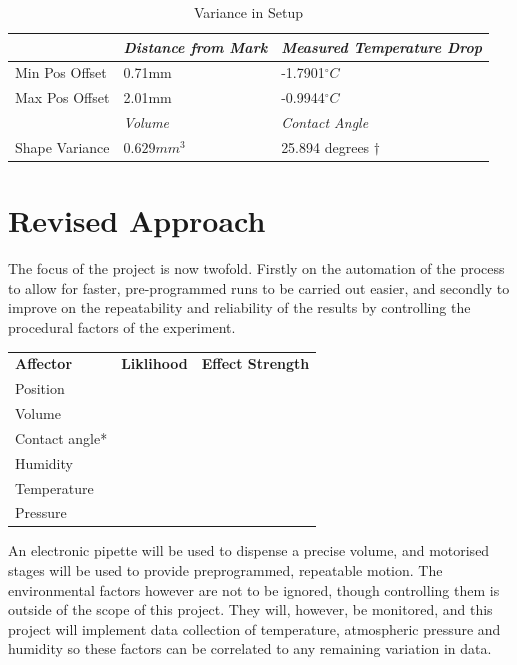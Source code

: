 \begin{table}[h]
    \centering
    \begin{tabular}{|l|l|l|}
    \hline
                   & \textit{Distance from Mark}          & \textit{Measured Temperature Drop} \\ \hline
    Min Pos Offset & 0.71mm                     &-1.7901$^{\circ}C$    \\ \hline
    Max Pos Offset &       2.01mm    &  -0.9944$^{\circ}C$    \\ \hline
                   & \textit{Volume}            & \textit{Contact Angle}          \\ \hline
    Shape Variance & $0.629mm^3$ & 25.894 degrees $\dagger$                \\ \hline
    \end{tabular}
    \caption{Variance in Setup}
    \end{table}


\section{Revised Approach}
The focus of the project is now twofold. Firstly on the automation of the process to allow for faster, pre-programmed runs to be carried out easier, and secondly to improve on the repeatability and reliability of the results by controlling the procedural factors of the experiment. 

\begin{table}[]
    \begin{tabular}{lll}
    \textbf{Affector} & \textbf{Liklihood} & \textbf{Effect Strength} \\
    Position          &                    &                          \\
    Volume            &                    &                          \\
    Contact angle*    &                    &                          \\
    Humidity          &                    &                          \\
    Temperature       &                    &                          \\
    Pressure          &                    &                         
    \end{tabular}
    \end{table}

An electronic pipette will be used to dispense a precise volume, and motorised stages will be used to provide preprogrammed, repeatable motion. The environmental factors however are not to be ignored, though controlling them is outside of the scope of this project. They will, however, be monitored, and this project will implement data collection of temperature, atmospheric pressure and humidity so these factors can be correlated to any remaining variation in data.  